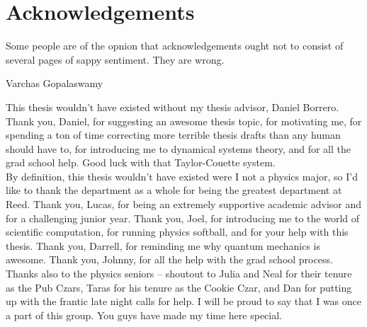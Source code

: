     \chapter*{Acknowledgements}
	\epigraph{Some people are of the opnion that acknowledgements ought not to consist of several pages of sappy sentiment. They are wrong.}{Varchas Gopalaswamy}

This thesis wouldn't have existed without my thesis advisor, Daniel Borrero. Thank you, Daniel, for suggesting an awesome thesis topic, for motivating me, for spending a ton of time correcting more terrible thesis drafts than any human should have to, for introducing me to dynamical systems theory, and for all the grad school help. Good luck with that Taylor-Couette system.\\

By definition, this thesis wouldn't have existed were I not a physics major, so I'd like to thank the department as a whole for being the greatest department at Reed. Thank you, Lucas, for being an extremely supportive academic advisor and for a  challenging junior year. Thank you, Joel, for introducing me to the world of scientific computation, for running physics softball, and for your help with this thesis. Thank you, Darrell, for reminding me why quantum mechanics is awesome. Thank you, Johnny, for all the help with the grad school process. Thanks also to the physics seniors -- shoutout to Julia and Neal for their tenure as the Pub Czars, Taras for his tenure as the Cookie Czar, and Dan for putting up with the frantic late night calls for help.  I will be proud to say that I was once a part of this group. You guys have made my time here special. \\


